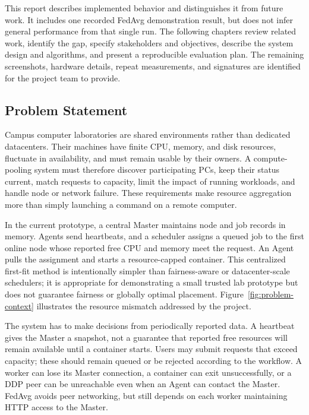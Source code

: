 \documentclass{article}
\begin{document}
This report describes implemented behavior and distinguishes it from future work. It includes one recorded FedAvg demonstration result, but does not infer general performance from that single run. The following chapters review related work, identify the gap, specify stakeholders and objectives, describe the system design and algorithms, and present a reproducible evaluation plan. The remaining screenshots, hardware details, repeat measurements, and signatures are identified for the project team to provide.

	\subsection{Problem Statement}

Campus computer laboratories are shared environments rather than dedicated datacenters. Their machines have finite CPU, memory, and disk resources, fluctuate in availability, and must remain usable by their owners. A compute-pooling system must therefore discover participating PCs, keep their status current, match requests to capacity, limit the impact of running workloads, and handle node or network failure. These requirements make resource aggregation more than simply launching a command on a remote computer.

In the current prototype, a central Master maintains node and job records in memory. Agents send heartbeats, and a scheduler assigns a queued job to the first online node whose reported free CPU and memory meet the request. An Agent pulls the assignment and starts a resource-capped container. This centralized first-fit method is intentionally simpler than fairness-aware or datacenter-scale schedulers; it is appropriate for demonstrating a small trusted lab prototype but does not guarantee fairness or globally optimal placement. Figure~\ref{fig:problem-context} illustrates the resource mismatch addressed by the project.

The system has to make decisions from periodically reported data. A heartbeat gives the Master a snapshot, not a guarantee that reported free resources will remain available until a container starts. Users may submit requests that exceed capacity; these should remain queued or be rejected according to the workflow. A worker can lose its Master connection, a container can exit unsuccessfully, or a DDP peer can be unreachable even when an Agent can contact the Master. FedAvg avoids peer networking, but still depends on each worker maintaining HTTP access to the Master.
\end{document}
